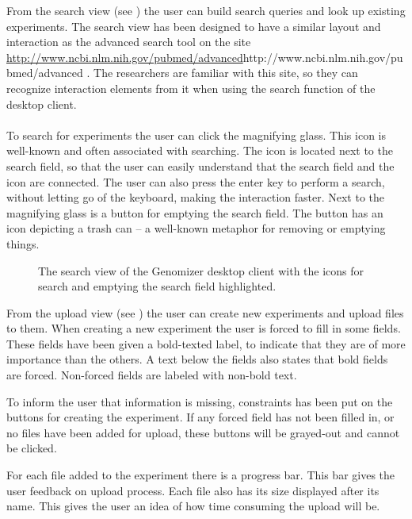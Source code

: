 From the search view (see ) the user can build search queries and look up existing experiments. The search view has been designed to have a similar layout and interaction as the advanced search tool on the site \\ \url{http://www.ncbi.nlm.nih.gov/pubmed/advanced}{http://www.ncbi.nlm.nih.gov/pubmed/advanced}
. The researchers are familiar with this site, so they can recognize interaction elements from it when using the search function of the desktop client.
\\\\
To search for experiments the user can click the magnifying glass. This icon is well-known and often associated with searching. The icon is located next to the search field, so that the user can easily understand that the search field and the icon are connected. The user can also press the enter key to perform a search, without letting go of the keyboard, making the interaction faster. Next to the magnifying glass is a button for emptying the search field. The button has an icon depicting a trash can -- a well-known metaphor for removing or emptying things.

\begin{figure}[h!]
	\caption{The search view of the Genomizer desktop client with the icons for search and emptying the search field highlighted.}
	\label{fig:des_search_tab_interaction}
\end{figure}

From the upload view (see ) the user can create new experiments and upload files to them. When creating a new experiment the user is forced to fill in some fields. These fields have been given a bold-texted label, to indicate that they are of more importance than the others. A text below the fields also states that bold fields are forced. Non-forced fields are labeled with non-bold text.

To inform the user that information is missing, constraints has been put on the buttons for creating the experiment. If any forced field has not been filled in, or no files have been added for upload, these buttons will be grayed-out and cannot be clicked.

For each file added to the experiment there is a progress bar. This bar gives the user feedback on upload process. Each file also has  its size displayed after its name. This gives the user an idea of how time consuming the upload will be.

